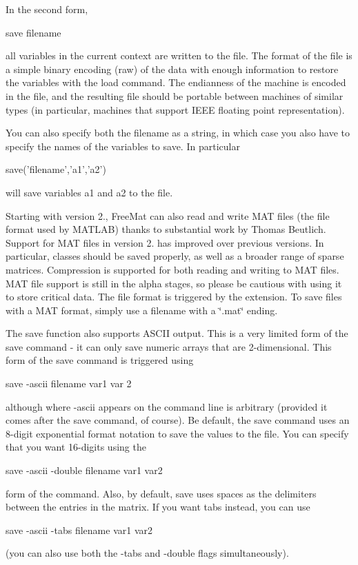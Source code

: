  In the second form, \begin{DoxyVerb}  save filename
\end{DoxyVerb}
 all variables in the current context are written to the file. The format of the file is a simple binary encoding (raw) of the data with enough information to restore the variables with the {\ttfamily load} command. The endianness of the machine is encoded in the file, and the resulting file should be portable between machines of similar types (in particular, machines that support I\-E\-E\-E floating point representation).

You can also specify both the filename as a string, in which case you also have to specify the names of the variables to save. In particular \begin{DoxyVerb}   save('filename','a1','a2')
\end{DoxyVerb}
 will save variables {\ttfamily a1} and {\ttfamily a2} to the file.

Starting with version 2., Free\-Mat can also read and write M\-A\-T files (the file format used by M\-A\-T\-L\-A\-B) thanks to substantial work by Thomas Beutlich. Support for M\-A\-T files in version 2. has improved over previous versions. In particular, classes should be saved properly, as well as a broader range of sparse matrices. Compression is supported for both reading and writing to M\-A\-T files. M\-A\-T file support is still in the alpha stages, so please be cautious with using it to store critical data. The file format is triggered by the extension. To save files with a M\-A\-T format, simply use a filename with a \char`\"{}.\-mat\char`\"{} ending.

The {\ttfamily save} function also supports A\-S\-C\-I\-I output. This is a very limited form of the save command -\/ it can only save numeric arrays that are 2-\/dimensional. This form of the {\ttfamily save} command is triggered using \begin{DoxyVerb}   save -ascii filename var1 var 2
\end{DoxyVerb}
 although where {\ttfamily -\/ascii} appears on the command line is arbitrary (provided it comes after the {\ttfamily save} command, of course). Be default, the {\ttfamily save} command uses an 8-\/digit exponential format notation to save the values to the file. You can specify that you want 16-\/digits using the \begin{DoxyVerb}   save -ascii -double filename var1 var2
\end{DoxyVerb}
 form of the command. Also, by default, {\ttfamily save} uses spaces as the delimiters between the entries in the matrix. If you want tabs instead, you can use \begin{DoxyVerb}   save -ascii -tabs filename var1 var2
\end{DoxyVerb}
 (you can also use both the {\ttfamily -\/tabs} and {\ttfamily -\/double} flags simultaneously).

